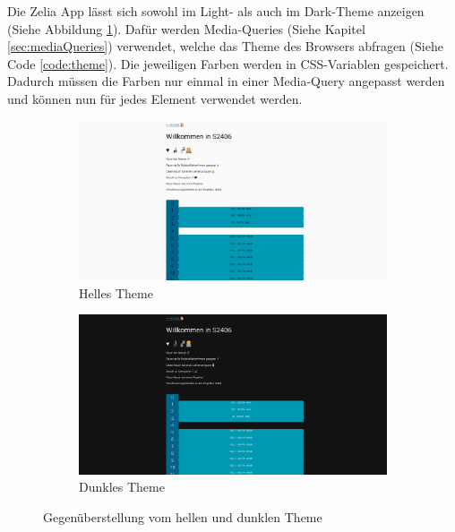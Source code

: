 
Die Zelia App lässt sich sowohl im Light- als auch im Dark-Theme anzeigen (Siehe Abbildung \ref{fig:theme}). Dafür werden Media-Queries (Siehe Kapitel \ref{sec:mediaQueries}) verwendet, welche das Theme des Browsers abfragen (Siehe Code \ref{code:theme}). 
Die jeweiligen Farben werden in CSS-Variablen gespeichert. Dadurch müssen die Farben nur einmal in einer Media-Query angepasst werden und können nun für jedes Element verwendet werden. 

\begin{figure}[H]
    \begin{subfigure}[c]{0.5\textwidth}
        \centering
        \includegraphics[width=\textwidth]{media/ResponsiveDesign/ZeliaDesktop.png}
        \caption{Helles Theme}
    \end{subfigure} \hfill
    \begin{subfigure}[c]{0.5\textwidth}
        \centering
        \includegraphics[width=\textwidth]{media/ResponsiveDesign/ZeliaDesktopDark.png}
        \caption{Dunkles Theme}
    \end{subfigure}
    \caption{Gegenüberstellung vom hellen und dunklen Theme}
    \label{fig:theme}
\end{figure}

